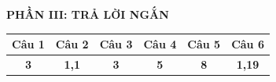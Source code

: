 \documentclass[11pt,a4paper]{article}
\begin{document}
\vspace{0.3cm}
\noindent\textbf{\color{mainGreen}PHẦN III: TRẢ LỜI NGẮN}
\begin{center}
\renewcommand{\arraystretch}{1.2}
\begin{tabular}{|c|c|c|c|c|c|}
\hline
\textbf{Câu 1} & \textbf{Câu 2} & \textbf{Câu 3} & \textbf{Câu 4} & \textbf{Câu 5} & \textbf{Câu 6} \\ \hline
\textbf{\color{red}3} & \textbf{\color{red}1,1} & \textbf{\color{red}3} & \textbf{\color{red}5} & \textbf{\color{red}8} & \textbf{\color{red}1,19} \\ \hline
\end{tabular}
\end{center}
\end{document}
